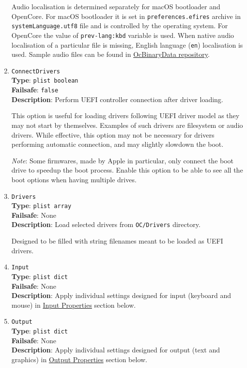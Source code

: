 \documentclass[]{article}
\begin{document}
\begin{enumerate}
  Audio localisation is determined separately for macOS bootloader and OpenCore.
  For macOS bootloader it is set in \texttt{preferences.efires} archive in
  \texttt{systemLanguage.utf8} file and is controlled by the operating system.
  For OpenCore the value of \texttt{prev-lang:kbd} variable is used.
  When native audio localisation of a particular file is missing, English language
  (\texttt{en}) localisation is used. Sample audio files can be found in
  \href{https://github.com/acidanthera/OcBinaryData}{OcBinaryData repository}.

\item
  \texttt{ConnectDrivers}\\
  \textbf{Type}: \texttt{plist\ boolean}\\
  \textbf{Failsafe}: \texttt{false}\\
  \textbf{Description}: Perform UEFI controller connection after driver loading.

  This option is useful for loading drivers following UEFI driver model
  as they may not start by themselves. Examples of such drivers are filesystem
  or audio drivers. While effective, this option may not be necessary for drivers
  performing automatic connection, and may slightly slowdown the boot.

  \emph{Note}: Some firmwares, made by Apple in particular, only connect the boot
  drive to speedup the boot process. Enable this option to be able to see all the
  boot options when having multiple drives.

\item
  \texttt{Drivers}\\
  \textbf{Type}: \texttt{plist\ array}\\
  \textbf{Failsafe}: None\\
  \textbf{Description}: Load selected drivers from \texttt{OC/Drivers}
  directory.

  Designed to be filled with string filenames meant to be loaded as UEFI
  drivers.

\item
  \texttt{Input}\\
  \textbf{Type}: \texttt{plist\ dict}\\
  \textbf{Failsafe}: None\\
  \textbf{Description}: Apply individual settings designed for input (keyboard and mouse) in
  \hyperref[uefiinputprops]{Input Properties} section below.

\item
  \texttt{Output}\\
  \textbf{Type}: \texttt{plist\ dict}\\
  \textbf{Failsafe}: None\\
  \textbf{Description}: Apply individual settings designed for output (text and graphics) in
  \hyperref[uefioutputprops]{Output Properties} section below.


\end{enumerate}
\end{document}
